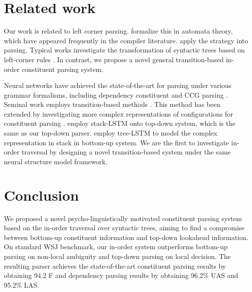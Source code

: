 \documentclass[11pt,letterpaper]{article}
\begin{document}
\section{Related work}
Our work is related to left corner parsing.
 formalize this in automata theory, which have appeared frequently in the compiler literature.
 apply the strategy into parsing. 
Typical works investigate the transformation of syntactic trees based on left-corner rules \cite{roark:2001,schuler:2010,van:2013}.
In contrast, we propose a novel general transition-based in-order constituent parsing system.
\begin{comment}
\newcite{noji:2014} propose left-corner dependency parsing, which is seminal work to propose a transition system for dependency parsing with a left-corner strategy. 
Their system is characterized by the rules that a node is enumerated when the subtree of its first child has been enumerated, and an arc is enumerated when the two nodes it connects have been enumerated.
They construct arcs with a dependency grammar, resulting a by-product of binarized trees.
In contrast, our constituent parsing system directly construct constituent trees without binarization.
Also, we realize the system on a neural transition-based parser, achieving the state-of-the-art results on constituent parsing, and dependency parsing by converting to Stanford dependency.
\end{comment}

Neural networks have achieved the state-of-the-art for parsing under various grammar formalisms, including dependency \cite{dozat:2017} constituent \cite{dyer:2016,kuncoro:2017} and CCG parsing \cite{xu:2016,lewis:2016}.
Seminal work employs transition-based methods \cite{chen:2014}.
This method has been extended by investigating more complex representations of configurations for constituent parsing \cite{watanabe:2015,dyer:2016}.
 employ stack-LSTM onto top-down system, which is the same as our top-down parser.
 employ tree-LSTM to model the complex representation in stack in bottom-up system.
We are the first to investigate in-order traversal by designing a novel transition-based system under the same neural structure model framework.


\section{Conclusion}
We proposed a novel psycho-linguistically motivated constituent parsing system based on the in-order traversal over syntactic trees, aiming to find a compromise between bottom-up constituent information and top-down lookahead information. 
On standard WSJ benchmark, our in-order system outperforms bottom-up parsing on non-local ambiguity and top-down parsing on local decision.
The resulting parser achieves the state-of-the-art constituent parsing results by obtaining 94.2 F and dependency parsing results by obtaining 96.2\% UAS and 95.2\% LAS.
\end{document}
